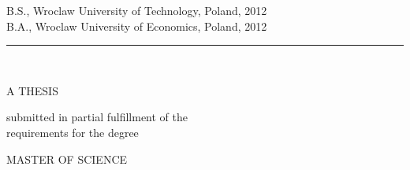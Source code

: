 \begin{center}

   B.S., Wroclaw University of Technology, Poland, 2012\\
   B.A., Wroclaw University of Economics, Poland, 2012\\

   \vspace{0.35cm}
   \rule{2in}{0.5pt}\\
   \vspace{0.65cm}

   {\large A THESIS}\\

   \vspace{0.3cm}
   \begin{singlespace}
   submitted in partial fulfillment of the\\
   requirements for the degree\\
   \end{singlespace}

   \vspace{0.3cm}


   {\large MASTER OF SCIENCE}\\
   \vspace{0.3cm}



\end{center}
